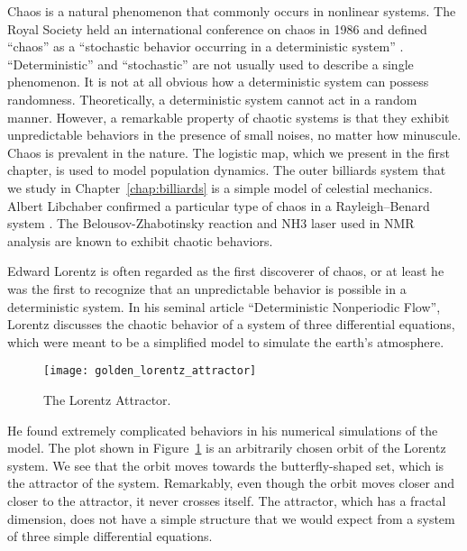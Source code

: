 \documentclass[10pt,twoside]{book}
\begin{document}
Chaos is a natural phenomenon that commonly occurs in nonlinear systems.
The Royal Society held an international conference on chaos in 1986 and defined ``chaos'' as a ``stochastic behavior occurring in a deterministic system'' \citep{stewart}.
``Deterministic'' and ``stochastic'' are not usually used to describe a single phenomenon.
It is not at all obvious how a deterministic system can possess randomness.
Theoretically, a deterministic system cannot act in a random manner.
However, a remarkable property of chaotic systems is that they exhibit unpredictable behaviors in the presence of small noises, no matter how minuscule.
Chaos is prevalent in the nature.
The logistic map, which we present in the first chapter, is used to model population dynamics.
The outer billiards system that we study in Chapter~\ref{chap:billiards} is a simple model of celestial mechanics.
Albert Libchaber confirmed a particular type of chaos in a Rayleigh–Benard system \citep{libchaber}.
The Belousov-Zhabotinsky reaction \citep{zhang} and NH3 laser used in NMR analysis \citep{kantz-schreiber} are known to exhibit chaotic behaviors.

Edward Lorentz is often regarded as the first discoverer of chaos, or at least he was the first to recognize that an unpredictable behavior is possible in a deterministic system.
In his seminal article ``Deterministic Nonperiodic Flow'', Lorentz discusses the chaotic behavior of a system of three differential equations, which were meant to be a simplified model to simulate the earth's atmosphere.
\begin{figure}[ht]
  \centering
  \texttt{[image: golden\_lorentz\_attractor]}
  \caption{The Lorentz Attractor.}
  \label{fig:lorentz}
\end{figure}
He found extremely complicated behaviors in his numerical simulations of the model.
The plot shown in Figure~\ref{fig:lorentz} is an arbitrarily chosen orbit of the Lorentz system.
We see that the orbit moves towards the butterfly-shaped set, which is the attractor of the system.
Remarkably, even though the orbit moves closer and closer to the attractor, it never crosses itself.
The attractor, which has a fractal dimension, does not have a simple structure that we would expect from a system of three simple differential equations.
\end{document}
